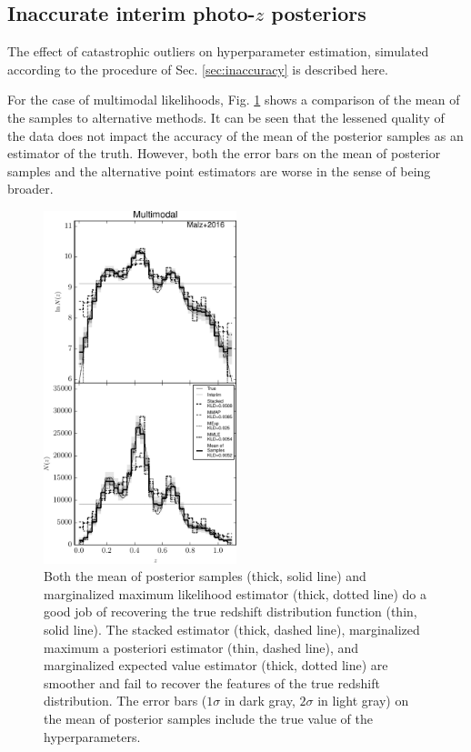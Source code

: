 \documentclass[preprint]{aastex}
\begin{document}
\subsection{Inaccurate interim photo-$z$ posteriors}
\label{sec:multi}

The effect of catastrophic outliers on hyperparameter estimation, simulated 
according to the procedure of Sec. \ref{sec:inaccuracy} is described here.  

For the case of multimodal likelihoods, Fig. \ref{fig:multi-comp} shows a 
comparison of the mean of the samples to alternative methods.  It can be seen 
that the lessened quality of the data does not impact the accuracy of the mean 
of the posterior samples as an estimator of the truth.  However, both the error 
bars on the mean of posterior samples and the alternative point estimators are 
worse in the sense of being broader.

\begin{figure}
\includegraphics[width=0.5\textwidth]{figs/mult/comps.pdf}
\caption{Both the mean of posterior samples (thick, solid line) and 
marginalized maximum likelihood estimator (thick, dotted line) do a good job of 
recovering the true redshift distribution function (thin, solid line).  The 
stacked estimator (thick, dashed line), marginalized maximum a posteriori 
estimator (thin, dashed line), and marginalized expected value estimator 
(thick, dotted line) are smoother and fail to recover the features of the true 
redshift distribution.  The error bars ($1\sigma$ in dark gray, $2\sigma$ in 
light gray) on the mean of posterior samples include the true value of the 
hyperparameters.}
\label{fig:multi-comp}
\end{figure}
\end{document}
